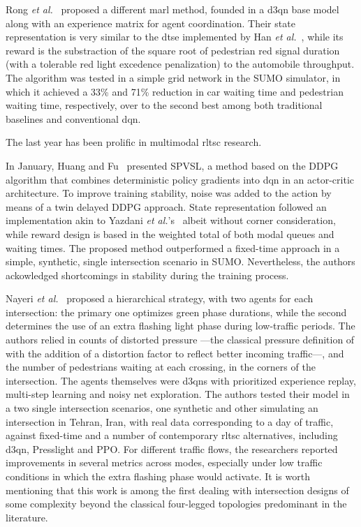 Rong \textit{et al.}~\cite{Rong2024} proposed a different \gls{marl} method, founded in a \gls{d3qn} base model along with an experience matrix for agent coordination. Their state representation is very similar to the \gls{dtse} implemented by Han \textit{et al.}~\cite{Han2022}, while its reward is  the substraction of the square root of pedestrian red signal duration (with a tolerable red light excedence penalization) to the automobile throughput. The algorithm was tested in a simple grid network in the SUMO simulator, in which it achieved a 33\% and 71\% reduction in car waiting time and pedestrian waiting time, respectively, over to the second best among both traditional baselines and conventional \gls{dqn}.

\medskip
\noindent The last year has been prolific in multimodal \gls{rltsc} research.

In January, Huang and Fu~\cite{Huang2025} presented SPVSL, a method based on the DDPG algorithm that combines deterministic policy gradients into \gls{dqn} in an actor-critic architecture. To improve training stability, noise was added to the action by means of a twin delayed DDPG approach. State representation followed an implementation akin to Yazdani \textit{et al.}'s~\cite{Yazdani2023} albeit without corner consideration, while reward design is based in the weighted total of both modal queues and waiting times. The proposed method outperformed a fixed-time approach in a simple, synthetic, single intersection scenario in SUMO. Nevertheless, the authors ackowledged shortcomings in stability during the training process.

Nayeri \textit{et al.}~\cite{Nayeri2025} proposed a hierarchical strategy, with two agents for each intersection: the primary one optimizes green phase durations, while the second determines the use of an extra flashing light phase during low-traffic periods. The authors relied in counts of distorted pressure —the classical pressure definition of \cite{Varaiya2013} with the addition of a distortion factor to reflect better incoming traffic—, and the number of pedestrians waiting at each crossing, in the corners of the intersection. The agents themselves were \gls{d3qn}s with prioritized experience replay, multi-step learning and noisy net exploration. The authors tested their model in a two single intersection scenarios, one synthetic and other simulating an intersection in Tehran, Iran, with real data corresponding to a day of traffic, against fixed-time and a number of contemporary \gls{rltsc} alternatives, including \gls{d3qn}, Presslight \cite{Wei2019b} and PPO. For different traffic flows, the researchers reported improvements in several metrics across modes, especially under low traffic conditions in which the extra flashing phase would activate. It is worth mentioning that this work is among the first dealing with intersection designs of some complexity beyond the classical four-legged topologies predominant in the literature.

